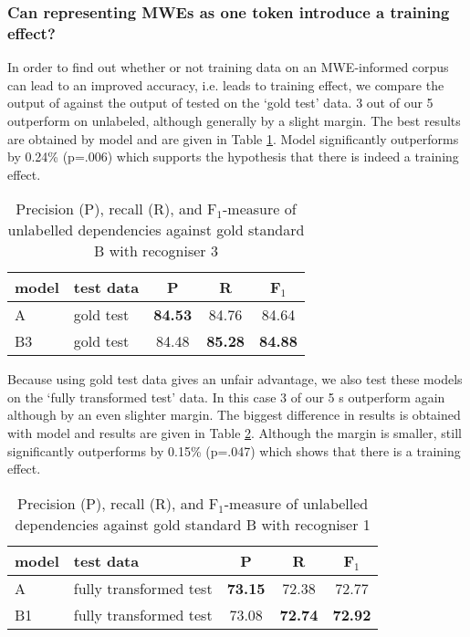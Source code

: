 \documentclass[output=paper]{LSP/langsci}
\begin{document}
\subsubsection{Can representing MWEs as one token introduce a training effect?}

\indent In order to find out whether or not training data on an MWE-informed corpus can lead to an improved accuracy, i.e. leads to training effect, we compare the output of \modelB against the output of \modelA tested on the `gold test' data. 3 out of our 5 \modelB outperform \modelA on unlabeled, although generally by a slight margin. The best results are obtained by model and are given in Table \ref{tab:res1}. Model significantly outperforms \modelA by 0.24\% (p=.006) which supports the hypothesis that there is indeed a training effect.

\begin{table}[H]
    \footnotesize
    \def\arraystretch{1.20} 
    \centering
    \begin{tabular}{| l | l | c | c | c |} \hline
        \textbf{model}
        & \textbf{test data}
        & \textbf{P}
        & \textbf{R}
        & \textbf{F$_1$}
        \\ \hline
        A & gold test &\textbf{84.53}  &84.76 &84.64 \\
        B3 & gold test &84.48  &\textbf{85.28}  &\textbf{84.88} \\
        \hline
    \end{tabular}
    \caption{Precision (P), recall (R), and F$_1$-measure of unlabelled dependencies against gold standard B with recogniser 3 \label{tab:res1}}
\end{table}

\indent Because using gold test data gives \modelB an unfair advantage, we also test these models on the `fully transformed test' data. In this case 3 of our 5 \modelB s outperform \modelA again although by an even slighter margin. The biggest difference in results is obtained with model and results are given in Table \ref{tab:res1bis}. Although the margin is smaller, \modelB still significantly outperforms \modelA by 0.15\% (p=.047) which shows that there is a training effect.

\begin{table}[H]
    \footnotesize
    \def\arraystretch{1.20} 
    \centering
    \begin{tabular}{| l | l | c | c | c |} \hline
        \textbf{model}
        & \textbf{test data}
        & \textbf{P}
        & \textbf{R}
        & \textbf{F$_1$}
        \\ \hline
        A & fully transformed test &\textbf{73.15}  &72.38  & 72.77 \\
        B1 & fully transformed test &73.08  &\textbf{72.74}  & \textbf{72.92} \\
        \hline
    \end{tabular}
    \caption{Precision (P), recall (R), and F$_1$-measure of unlabelled dependencies against gold standard B with recogniser 1 \label{tab:res1bis}}
\end{table}
\end{document}
